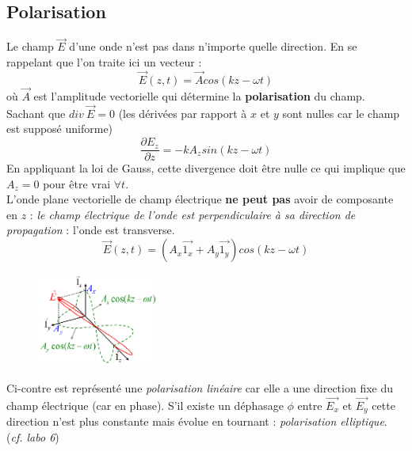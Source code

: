 \documentclass	[11pt, a4paper, openany]{book}
\begin{document}
		\subsection{Polarisation}
		Le champ $\vec{E}$ d'une onde n'est pas dans n'importe quelle direction. En se rappelant que l'on traite ici un vecteur : 
		\begin{equation}
			\vec{E}(z, t) = \vec{A}cos(kz - \omega t)
		\end{equation}
		où $\vec{A}$ est l'amplitude vectorielle qui détermine la \textbf{polarisation} du champ. Sachant que $div\ \vec{E} = 0$ (les dérivées par rapport à $x$ et $y$ sont nulles car le champ est supposé uniforme)
		\begin{equation}
			\frac{\partial E_z}{\partial z} = -kA_z sin(kz - \omega t)
		\end{equation}
		En appliquant la loi de Gauss, cette divergence doit être nulle ce qui implique que $A_z = 0$ pour être vrai $\forall t$. \\
		L'onde plane vectorielle de champ électrique \textbf{ne peut pas} avoir de composante en $z$ : \textit{le champ électrique de l'onde est perpendiculaire à sa direction de propagation} : l'onde est transverse.\\
		
		\begin{equation}
			\vec{E}(z,t) = (A_x\vec{1_x} + A_y \vec{1_y})cos(kz - \omega t)
		\end{equation}
		
		\begin{figure}
			\includegraphics[width=4cm]{oo/image34.png}
		\end{figure}
		Ci-contre est représenté une \textit{polarisation linéaire} car elle a une direction fixe du champ électrique (car en phase). S'il existe un déphasage $\phi$ entre $\vec{E_x}$ et $\vec{E_y}$ cette direction n'est plus constante mais évolue en tournant : \textit{polarisation elliptique}. (\textit{cf. labo 6})
		
\end{document}
